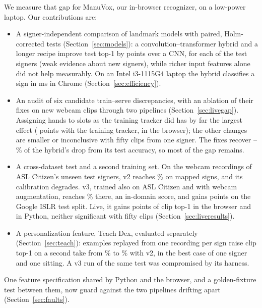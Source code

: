 We measure that gap for ManuVox, our in-browser recognizer, on a low-power laptop. Our
contributions are:
\begin{itemize}
\item A signer-independent comparison of landmark models with paired, Holm-corrected tests
  (Section~\ref{sec:models}): a convolution--transformer hybrid and a longer recipe improve test
  top-1 by  points over a CNN, for each of the  test signers
  (weak evidence about new signers), while richer input features alone did not help measurably. On an Intel i3-1115G4 laptop the
  hybrid classifies a sign in  ms in Chrome (Section~\ref{sec:efficiency}).
\item An audit of six candidate train--serve discrepancies, with an ablation of their fixes on
   new webcam clips through two pipelines (Section~\ref{sec:livegap}). Assigning hands
  to slots as the training tracker did has by far the largest effect (
  points with the training tracker,  in the browser); the other changes
  are smaller or inconclusive with fifty clips from one signer. The fixes recover
  --\% of the hybrid's drop from its test accuracy, so most of
  the gap remains.
\item A cross-dataset test and a second training set. On the webcam recordings of ASL Citizen's
  unseen test signers, v2 reaches \% on  mapped signs, and its
  calibration degrades. v3, trained also on ASL Citizen and with webcam augmentation, reaches
  \% there, an in-domain score, and gains  points on the Google ISLR
  test split. Live, it gains  points of clip top-1 in the browser and
   in Python, neither significant with fifty clips (Section~\ref{sec:liveresults}).
\item A personalization feature, Teach Dex, evaluated separately (Section~\ref{sec:teach}):
  examples replayed from one recording per sign raise clip top-1 on a second take from
  \% to \% with v2, in the best case of one signer and one sitting.
  A v3 run of the same test was compromised by its harness.
\end{itemize}
One feature specification shared by Python and the browser, and a golden-fixture test between
them, now guard against the two pipelines drifting apart (Section~\ref{sec:faults}).
